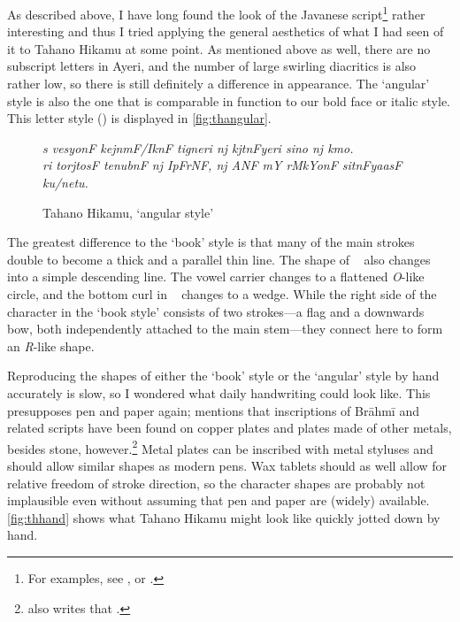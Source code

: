 As described above, I have long found the look of the Javanese
script\footnote{For examples, see \citet{everson2008}, or .}
rather interesting and thus I tried applying the general aesthetics of what I
had seen of it to Tahano Hikamu at some point. As mentioned above as well,
there are no subscript letters in Ayeri, and the number of large swirling
diacritics is also rather low, so there is still definitely a difference in
appearance. The `angular' style is also the one that is comparable in function
to our bold face or italic style. This letter style
() is displayed in \autoref{fig:thangular}.

\begin{figure}[ht]\centering
{\Tagati\itshape\Large s vesyonF kejnmF/IknF tigneri nj kjtnFyeri sino nj
kmo.\\
ri torjtosF tenubnF nj IpFrNF, nj ANF mY rMkYonF sitnFyaasF ku/netu.}
\caption{Tahano Hikamu, `angular style'}
\label{fig:thangular}
\end{figure}

The greatest difference to the `book' style is that many of the main strokes 
double to become a thick and a parallel thin line. The shape of 
~ also changes into a simple descending line. The vowel carrier
 changes to a flattened \textit{O}-like circle, and the bottom curl in
~ changes to a wedge. While the right side of the
~ character in the `book style' consists of two strokes---a
flag and a downwards bow, both independently attached to the main stem---they
connect here to form an \emph{R}-like shape.

Reproducing the shapes of either
the `book' style or the `angular' style by hand accurately is slow, so I
wondered what daily handwriting could look like. This presupposes pen and paper
again; \citet[377]{salomon1996} mentions that inscriptions of Brāhmī and
related scripts have been found on copper plates and plates made of other
metals, besides stone, however.\footnote{\citet{salomon1996} also writes that
.} Metal plates can be inscribed with metal
styluses and should allow similar shapes as modern pens. Wax tablets should as
well allow for relative freedom of stroke direction, so the character shapes are
probably not implausible even without assuming that pen and paper are (widely)
available. \autoref{fig:thhand} shows what Tahano Hikamu might look like
quickly jotted down by hand.


